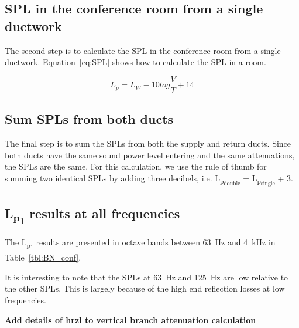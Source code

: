 \subsection{SPL in the conference room from a single ductwork}

The second step is to calculate the SPL in the conference room from a single ductwork.
Equation~\ref{eq:SPL} shows how to calculate the SPL in a room.

	\begin{equation}\label{eq:SPL}
		L_{p} = L_{W} - 10 log \frac{V}{T} + 14
	\end{equation}


\subsection{Sum SPLs from both ducts}

The final step is to sum the SPLs from both the supply and return ducts.
Since both ducts have the same sound power level entering and the same attenuations, the SPLs are the same.
For this calculation, we use the rule of thumb for summing two identical SPLs by adding three decibels, i.e. L\textsubscript{p\textsubscript{double}} = L\textsubscript{p\textsubscript{single}} + 3.


\subsection{L\textsubscript{p\textsubscript{1}} results at all frequencies}

The L\textsubscript{p\textsubscript{1}} results are presented in octave bands between 63~Hz and 4~kHz in Table~\ref{tbl:BN_conf}.

It is interesting to note that the SPLs at 63~Hz and 125~Hz are low relative to the other SPLs.
This is largely because of the high end reflection losses at low frequencies.

\textbf{Add details of hrzl to vertical branch attenuation calculation}





